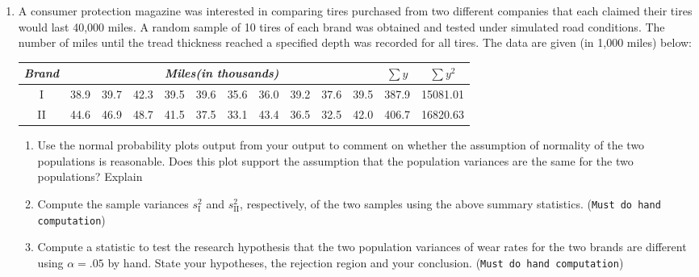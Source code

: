 \documentclass[11pt]{article}
\begin{document}
\begin{enumerate}
\item A consumer protection magazine was interested in comparing tires
purchased from two different companies that each claimed their tires
would last 40,000 miles. A random sample of 10 tires of each brand
was obtained and tested under simulated road conditions. The number
of miles until the tread thickness reached a specified depth was
recorded for all tires. The data are given (in 1,000 miles) below:
\begin{center}
\begin{tabular}{c|rrrrrrrrrr|rr}
\hline 
 \multicolumn{1}{c|}{\textit{Brand}} & \multicolumn{10}{c|}{\textit{Miles(in thousands)}} & 
     \multicolumn{1}{c}{$\sum{y}$} &
     \multicolumn{1}{c}{$\sum{y^2}$}  \\ \hline
I  &38.9 &39.7 &42.3 &39.5 &39.6 &35.6 &36.0 &39.2 &37.6 &39.5 & 387.9 & 15081.01\\
II &44.6 &46.9 &48.7 &41.5 &37.5 &33.1 &43.4 &36.5 &32.5 &42.0 & 406.7 & 16820.63 \\ \hline
\end{tabular}
\end{center}
\begin{enumerate}
\item Use the normal probability plots output from your output
to comment on whether the assumption of normality of the two populations
is reasonable. Does this plot support the assumption that
the population variances are the same for the two populations? 
Explain
\item Compute the sample variances $s_{\mbox{I}}^2$ and $s_{\mbox{II}}^2$, respectively, of 
the two samples using the above summary statistics. (\texttt{Must do hand computation})
\item Compute a statistic to test the research hypothesis that the two 
population variances of wear rates for the two brands are different using 
$\alpha=.05$ by hand. State your hypotheses, the rejection region and 
your conclusion. (\texttt{Must do hand computation})\\[1.7in]
\end{enumerate}
\end{enumerate}
\end{document}
